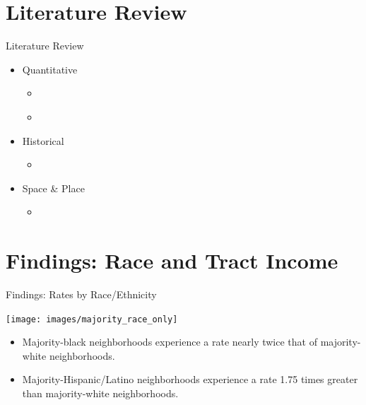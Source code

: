 \documentclass{beamer}
\begin{document}
\section{Literature Review}
\begin{frame}{Literature Review}
	\begin{itemize}
		\item Quantitative
		\begin{itemize}
			\item \textcite{feldmanPoliceRelatedDeathsNeighborhood2019}
			\item \textcite{feldmanPoliceKillingsUS2020} \pause
		\end{itemize}
		\item Historical
		\begin{itemize}
			\item \citeauthor{johnsonAfterwordBaltimorePolicing2016} \parencites*{
			johnsonAfterwordBaltimorePolicing2016, 
			johnsonTrumpismPolicingProblem2019, 
			johnsonBlackLivesMatter2023} \pause
		\end{itemize}
		\item Space \& Place
		\begin{itemize}
			\item \textcite{wacquantClassRaceHyperincarceration2010}
		\end{itemize}
	\end{itemize}
\end{frame}

\section{Findings: Race and Tract Income}
\begin{frame}{Findings: Rates by Race/Ethnicity}
	\begin{center}
	\texttt{[image: images/majority\_race\_only]}	
	\end{center}
	
	\vspace*{24pt}
	
	\begin{itemize}
	\item Majority-black neighborhoods experience a rate nearly twice that of majority-white neighborhoods.
	\item Majority-Hispanic/Latino neighborhoods experience a rate 1.75 times greater than majority-white neighborhoods.
	\end{itemize}	
\end{frame}
\end{document}
